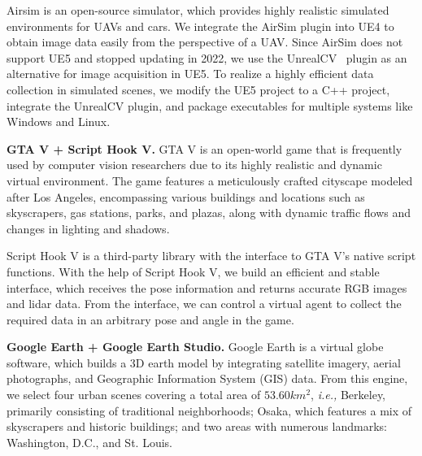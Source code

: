 Airsim is an open-source simulator, which provides highly realistic simulated environments for UAVs and cars. We integrate the AirSim plugin into UE4 to obtain image data easily from the perspective of a UAV.
Since AirSim does not support UE5 and stopped updating in 2022, we use the UnrealCV~\cite{unrealcv} plugin as an alternative for image acquisition in UE5. To realize a highly efficient data collection in simulated scenes, we modify the UE5 project to a C++ project, integrate the UnrealCV plugin, and package executables for multiple systems like Windows and Linux. 

\textbf{GTA V + Script Hook V.} 
GTA V is an open-world game that is frequently used by computer vision researchers due to its highly realistic and dynamic virtual environment. The game features a meticulously crafted cityscape modeled after Los Angeles, encompassing various buildings and locations such as skyscrapers, gas stations, parks, and plazas, along with dynamic traffic flows and changes in lighting and shadows. 

Script Hook V is a third-party library with the interface to GTA V's native script functions. With the help of Script Hook V, we build an efficient and stable interface, which receives the pose information and returns accurate RGB images and lidar data. From the interface, we can control a virtual agent to collect the required data in an arbitrary pose and angle in the game.

\textbf{Google Earth + Google Earth Studio.} 
Google Earth is a virtual globe software, which builds a 3D earth model by integrating satellite imagery, aerial photographs, and Geographic Information System (GIS) data. From this engine, we select four urban scenes covering a total area of $53.60 km^2 $, \emph{i.e.,} Berkeley, primarily consisting of traditional neighborhoods; Osaka, which features a mix of skyscrapers and historic buildings; and two areas with numerous landmarks: Washington, D.C., and St. Louis.

